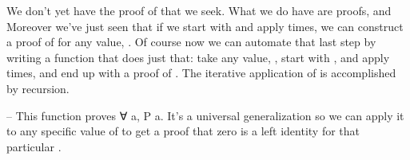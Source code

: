 \documentclass[letterpaper,10pt,english]{sphinxmanual}
\begin{document}
\begin{sphinxVerbatim}[commandchars=\\\{\}]
 
\end{sphinxVerbatim}

\sphinxAtStartPar
We don’t yet have the proof of  that
we seek. What we do have are proofs, 
and  Moreover we’ve
just seen that if we start with  and apply
 times, we can construct a proof of 
for any value, . Of course now we can automate
that last step by writing a function that does
just that: take any value, , start with ,
and apply  times, and end up with a proof
of . The iterative application of  is
accomplished by recursion.

\begin{sphinxVerbatim}[commandchars=\\\{\}]
           
   
       

 
\end{sphinxVerbatim}

\sphinxAtStartPar
– This function proves ∀ a, P a. It’s a universal
generalization so we can apply it to any specific value
of  to get a proof that zero is a left identity for that
particular .

\begin{sphinxVerbatim}[commandchars=\\\{\}]
  
  
  
  
\end{sphinxVerbatim}
\end{document}
